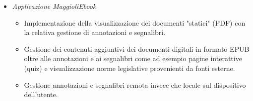 \begin{itemize}
\begin{itemize}
    \end{itemize}
    \item \textit{Applicazione MaggioliEbook}
    \begin{itemize}
        \item Implementazione della visualizzazione dei documenti "statici" (PDF) con la relativa gestione di annotazioni e segnalibri.
        \item Gestione dei contenuti aggiuntivi dei documenti digitali in formato EPUB oltre alle annotazioni e ai segnalibri come ad esempio pagine interattive (quiz) e visualizzazione norme legislative provenienti da fonti esterne.
        \item Gestione annotazioni e segnalibri remota invece che locale sul dispositivo dell'utente.
    \end{itemize}
\end{itemize}